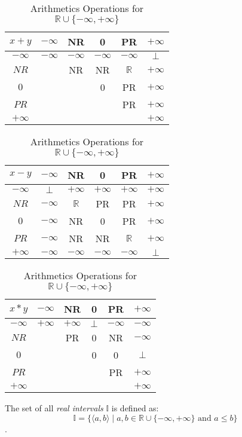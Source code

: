 \begin{table} 
\begin{tabular}{c||*{5}{c|}}
$x + y$
&$-\infty$&NR&0
&PR&$+\infty$\\\hline
$-\infty$ &$-\infty$&$-\infty$&$-\infty$&$-\infty$&$\bot$\\\hline
$NR$ &&NR&NR&$\mathbb{R}$&$+\infty$\\\hline
$0$&&&0&PR&$+\infty$\\\hline
$PR$ &&&&PR&$+\infty$\\\hline
$+\infty$ &&&&&$+\infty$\\\hline
\end{tabular}
\quad
\begin{tabular}{c||*{5}{c|}}
$x - y$
&$-\infty$&NR&0
&PR&$+\infty$\\\hline
$-\infty$ &$\bot$&$+\infty$&$+\infty$&$+\infty$&$+\infty$\\\hline
$NR$ &$-\infty$&$\mathbb{R}$&PR&PR&$+\infty$\\\hline
$0$&$-\infty$&NR&0&PR&$+\infty$\\\hline
$PR$ &$-\infty$&NR&NR&$\mathbb{R}$&$+\infty$\\\hline
$+\infty$ &$-\infty$&$-\infty$&$-\infty$&$-\infty$&$\bot$\\\hline
\end{tabular}
\newline
\vspace*{1 cm}
\newline
\begin{center}
\begin{tabular}{c||*{5}{c|}}
$x * y$
&$-\infty$&NR&0
&PR&$+\infty$\\\hline
$-\infty$ &$+\infty$&$+\infty$&$\bot$&$-\infty$&$-\infty$\\\hline
$NR$ &&PR&0&NR&$-\infty$\\\hline
$0$&&&0&0&$\bot$\\\hline
$PR$ &&&&PR&$+\infty$\\\hline
$+\infty$ &&&&&$+\infty$\\\hline
\end{tabular}
\end{center}
\caption{Arithmetics Operations for $\mathbb{R} \cup \{-\infty, +\infty\}$}
\label{tab:arithOp}
\end{table}

\begin{definition} \label{def:real_intervals}
The set of all \emph{real intervals} $\mathbb{I}$ is defined as: \[\mathbb{I} = \{\langle a, b \rangle \mid a, b \in \mathbb{R} \cup \{-\infty, +\infty\} \text{ and } a \le b \}\].
\end{definition}

